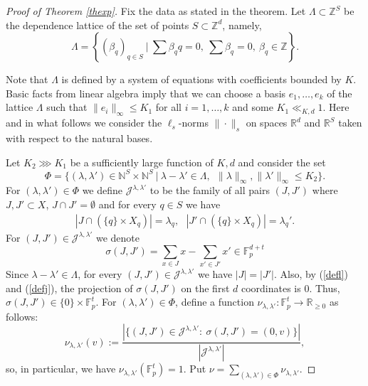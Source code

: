 \documentclass{daj}
\renewcommand{\le}{\leqslant}
\renewcommand{\ge}{\geqslant}
\newcommand{\R}{\mathbb R}
\newcommand{\Z}{\mathbb Z}
\newcommand{\N}{\mathbb N}
\newcommand{\FF}{\mathbb F}
\newcommand{\J}{\mathcal J}
\theoremstyle{definition}
\theoremstyle{remark}
\theoremstyle{definition}
\theoremstyle{definition}
\begin{document}
\begin{proof}[Proof of Theorem \ref{thexp}]
Fix the data as stated in the theorem.
Let $\Lambda \subset \Z^S$ be the dependence lattice of the set of points $S \subset \Z^d$, namely,
\begin{equation}\label{defl}
\Lambda = \left \{ (\beta_q)_{q \in S}~|~ \sum \beta_q q = 0,~\sum \beta_q = 0,~ \beta_q \in \Z \right\}.
\end{equation}

Note that $\Lambda$ is defined by a system of equations with coefficients bounded by $K$. Basic facts from linear algebra imply that we can choose a basis $e_1, \ldots, e_k$ of the lattice $\Lambda$ such that $\|e_i\|_\infty \le K_1$ for all $i = 1, \ldots, k$ and some $K_1 \ll_{K, d} 1$. Here and in what follows we consider the $\ell_s$-norms $\|\cdot \|_s$ on spaces $\R^d$ and $\R^{S}$ taken with respect to the natural bases. 

Let $K_2 \ggg K_1$ be a sufficiently large function of $K, d$ and consider the set 
$$
\Phi = \{ (\lambda, \lambda') \in \N^S \times \N^S ~|~ \lambda - \lambda' \in \Lambda,~~ \| \lambda \|_\infty, \| \lambda' \|_\infty \le  K_2 \}.
$$
For $(\lambda, \lambda') \in \Phi$ we define $\J^{\lambda, \lambda'}$ to be the family of all pairs $(J, J')$ where $J, J' \subset X$, $J \cap J' = \emptyset$ and for every $q \in S$ we have
\begin{align}\label{defj}
    |J \cap (\{q\} \times X_q) | = \lambda_q, ~~~
    |J' \cap (\{q\} \times X_q) | = \lambda_q'.
\end{align}
For $(J, J') \in \J^{\lambda, \lambda'}$ we denote 
\begin{equation}\label{sigma}
\sigma(J, J') = \sum_{x \in J} x - \sum_{x' \in J'} x' \in \FF_p^{d+t}    
\end{equation}
Since $\lambda-\lambda' \in \Lambda$, for every $(J, J') \in \J^{\lambda, \lambda'}$ we have $|J| = |J'|$. Also, by (\ref{defl}) and (\ref{defj}), the projection of $\sigma(J, J')$ on the first $d$ coordinates is 0. Thus, $\sigma(J,J') \in \{0\} \times \FF_p^t$. For $(\lambda, \lambda') \in \Phi$, define a function $\nu_{\lambda, \lambda'}: \FF_p^t \rightarrow \R_{\ge 0}$ as follows:
\begin{equation}\label{nu}
    \nu_{\lambda, \lambda'}(v) :=   \frac{| \{(J, J') \in \J^{\lambda, \lambda'}:~\sigma(J, J') = (0,v)\}|}{|\J^{\lambda, \lambda'}|}, 
\end{equation}
so, in particular, we have $\nu_{\lambda, \lambda'}(\FF_p^t) = 1$. Put $\nu = \sum_{(\lambda, \lambda') \in \Phi} \nu_{\lambda, \lambda'}$.


\end{proof}
\end{document}

